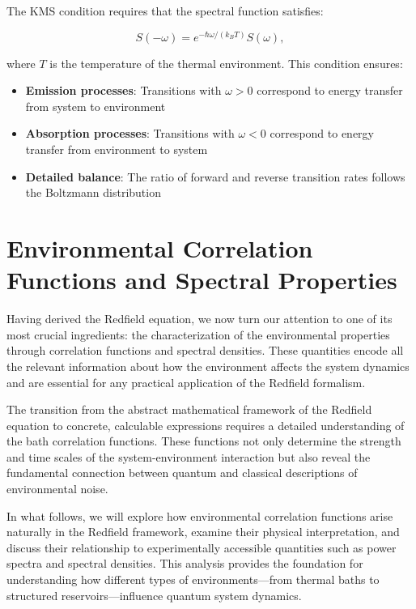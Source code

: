 The KMS condition requires that the spectral function satisfies:

\begin{equation}
	S(-\omega) = e^{-\hbar\omega/(k_B T)} S(\omega),
	\label{eq:kms_condition}
\end{equation}

where $T$ is the temperature of the thermal environment. This condition ensures:

\begin{itemize}
	\item \textbf{Emission processes}: Transitions with $\omega > 0$ correspond to energy transfer from system to environment
	\item \textbf{Absorption processes}: Transitions with $\omega < 0$ correspond to energy transfer from environment to system
	\item \textbf{Detailed balance}: The ratio of forward and reverse transition rates follows the Boltzmann distribution
\end{itemize}


\section{Environmental Correlation Functions and Spectral Properties}
\label{sec:environmental_correlation_functions}

Having derived the Redfield equation, we now turn our attention to one of its most crucial ingredients: the characterization of the environmental properties through correlation functions and spectral densities. These quantities encode all the relevant information about how the environment affects the system dynamics and are essential for any practical application of the Redfield formalism.

The transition from the abstract mathematical framework of the Redfield equation to concrete, calculable expressions requires a detailed understanding of the bath correlation functions. These functions not only determine the strength and time scales of the system-environment interaction but also reveal the fundamental connection between quantum and classical descriptions of environmental noise.

In what follows, we will explore how environmental correlation functions arise naturally in the Redfield framework, examine their physical interpretation, and discuss their relationship to experimentally accessible quantities such as power spectra and spectral densities. This analysis provides the foundation for understanding how different types of environments—from thermal baths to structured reservoirs—influence quantum system dynamics.

